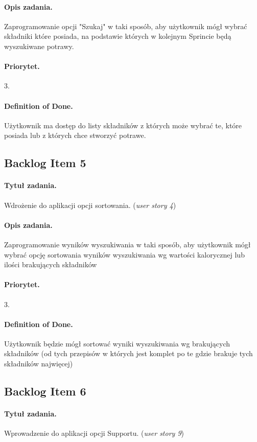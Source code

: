 \documentclass[a4paper]{article}
\begin{document}
	\paragraph{Opis zadania.} Zaprogramowanie opcji "Szukaj" w taki sposób, aby użytkownik mógł wybrać składniki które posiada, na podstawie których w kolejnym Sprincie będą wyszukiwane potrawy.
	\paragraph{Priorytet.} 3.
	\paragraph{Definition of Done.} Użytkownik ma dostęp do listy składników z których może wybrać te, które posiada lub z których chce stworzyć potrawe.
	
	\subsection{Backlog Item 5}
	\paragraph{Tytuł zadania.} Wdrożenie do aplikacji opcji sortowania. (\textit{user story 4})
	\paragraph{Opis zadania.} Zaprogramowanie wyników wyszukiwania w taki sposób, aby użytkownik mógł wybrać opcję sortowania wyników wyszukiwania wg wartości kalorycznej lub ilości brakujących składników
	\paragraph{Priorytet.} 3.
	\paragraph{Definition of Done.} Użytkownik będzie mógł sortować wyniki wyszukiwania wg brakujących składników (od tych przepisów w których jest komplet po te gdzie brakuje tych składników najwięcej)
	
	\subsection{Backlog Item 6}
	\paragraph{Tytuł zadania.} Wprowadzenie do aplikacji opcji Supportu. (\textit{user story 9})
\end{document}
